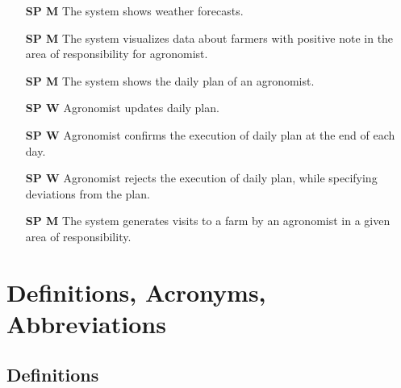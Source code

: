 \begin{itemize}
    \item [\textbf{SP M}] The system shows weather forecasts.
    \item [\textbf{SP M}] The system visualizes data about farmers with positive note in the area of responsibility for agronomist.
    \item [\textbf{SP M}] The system shows the daily plan of an agronomist.
    \item [\textbf{SP W}] Agronomist updates daily plan.
    \item [\textbf{SP W}] Agronomist confirms the execution of daily plan at the end of each day.
    \item [\textbf{SP W}] Agronomist rejects the execution of daily plan, while specifying deviations from the plan.
    \item [\textbf{SP M}] The system generates visits to a farm by an agronomist in a given area of responsibility.
\end{itemize}

\section{Definitions, Acronyms, Abbreviations}

\subsection{Definitions}

